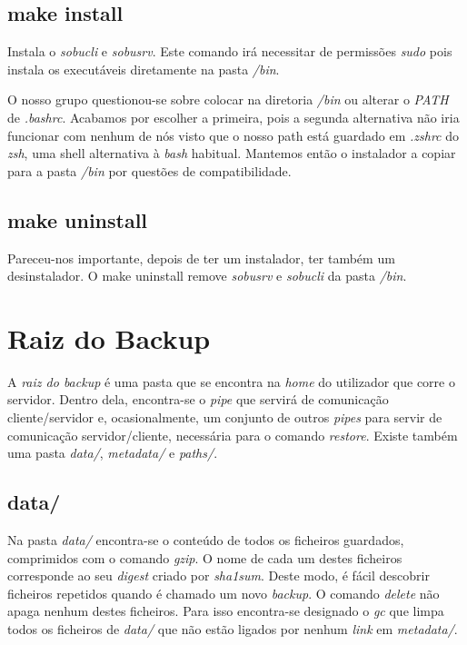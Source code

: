 \documentclass[12pt,a4paper]{report}
\begin{document}
\section{make install}
Instala o \emph{sobucli} e \emph{sobusrv}. Este comando irá necessitar de permissões \emph{sudo} pois instala os executáveis diretamente na pasta \emph{/bin}.\par O nosso grupo questionou-se sobre colocar na diretoria \emph{/bin} ou alterar o \emph{PATH} de \emph{.bashrc}. Acabamos por escolher a primeira, pois a segunda alternativa não iria funcionar com nenhum de nós visto que o nosso path está guardado em \emph{.zshrc} do \emph{zsh}, uma shell alternativa à \emph{bash} habitual. Mantemos então o instalador a copiar para a pasta \emph{/bin} por questões de compatibilidade.

\section{make uninstall}
Pareceu-nos importante, depois de ter um instalador, ter também um desinstalador. O make uninstall remove \emph{sobusrv} e \emph{sobucli} da pasta \emph{/bin}.

\chapter{Raiz do Backup}
A \emph{raiz do backup} é uma pasta que se encontra na \emph{home} do utilizador que corre o servidor. Dentro dela, encontra-se o \emph{pipe} que servirá de comunicação cliente/servidor e, ocasionalmente, um conjunto de outros \emph{pipes} para servir de comunicação servidor/cliente, necessária para o comando \emph{restore}. Existe também uma pasta \emph{data/}, \emph{metadata/} e \emph{paths/}.\par

\section{data/}
Na pasta \emph{data/} encontra-se o conteúdo de todos os ficheiros guardados, comprimidos com o comando \emph{gzip}. O nome de cada um destes ficheiros corresponde ao seu \emph{digest} criado por \emph{sha1sum}. Deste modo, é fácil descobrir ficheiros repetidos quando é chamado um novo \emph{backup}. O comando \emph{delete} não apaga nenhum destes ficheiros. Para isso encontra-se designado o \emph{gc} que limpa todos os ficheiros de \emph{data/} que não estão ligados por nenhum \emph{link} em \emph{metadata/}.
\end{document}
